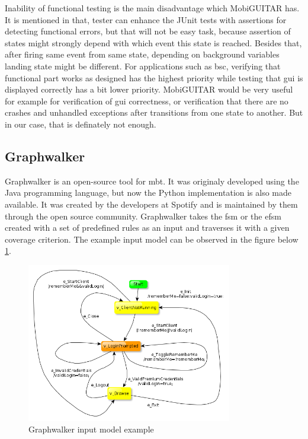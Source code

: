 \par
Inability of functional testing is the main disadvantage which MobiGUITAR has. It is mentioned in \cite{MobiGUITAR} that, tester can enhance the JUnit tests with assertions for detecting functional errors, but that will not be easy task, because assertion of states might strongly depend with which event this state is reached. Besides that, after firing same event from same state, depending on background variables landing state might be different. For applications such as \acrshort{bsc}, verifying that functional part works as designed has the highest priority while testing that \acrshort{gui} is displayed correctly has a bit lower priority. MobiGUITAR would be very useful for example for verification of \acrshort{gui} correctness, or verification that there are no crashes and unhandled exceptions after transitions from one state to another. But in our case, that is definately not enough.

\subsection{Graphwalker}
\par
Graphwalker \cite{Graphwalker_Description} is an open-source tool for \acrshort{mbt}. It was originaly developed using the Java programming language, but now the Python implementation is also made available. It was created by the developers at Spotify \cite{Spotify} and is maintained by them through the open source community. Graphwalker takes the \acrshort{fsm} or the \acrshort{efsm} created with a set of predefined rules as an input and traverses it with a given coverage criterion.
The example input model can be observed in the figure below \ref{Fig:Graphwalker_model_example}.

\begin{figure} [htbp!]
	\centering
					\includegraphics[width=0.8\textwidth]{figures/Graphwalker_model_example.png}
					\caption{\label{Fig:Graphwalker_model_example} Graphwalker input model example \cite{Graphwalker_Login_Example}}
\end{figure}


